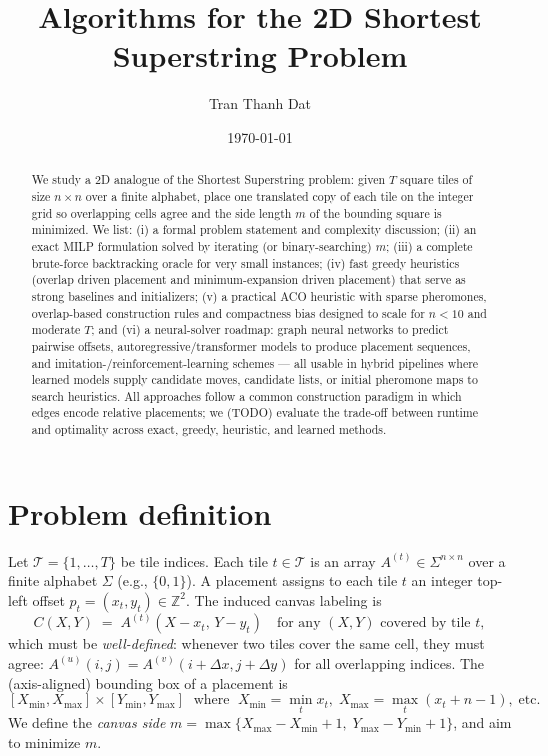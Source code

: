 \documentclass[11pt]{article}
\title{Algorithms for the \newline 2D Shortest Superstring Problem}
\author{Tran Thanh Dat}
\date{\today}
\newcommand{\bbZ}{\mathbb{Z}}
\begin{document}
\maketitle

\begin{abstract}
We study a 2D analogue of the Shortest Superstring problem: given $T$ square tiles of size $n\times n$ over a finite alphabet, place one translated copy of each tile on the integer grid so overlapping cells agree and the side length $m$ of the bounding square is minimized. We list: (i) a formal problem statement and complexity discussion; (ii) an exact MILP formulation solved by iterating (or binary-searching) $m$; (iii) a complete brute-force backtracking oracle for very small instances; (iv) fast greedy heuristics (overlap driven placement and minimum-expansion driven placement) that serve as strong baselines and initializers; (v) a practical ACO heuristic with sparse pheromones, overlap-based construction rules and compactness bias designed to scale for $n<10$ and moderate $T$; and (vi) a neural-solver roadmap: graph neural networks to predict pairwise offsets, autoregressive/transformer models to produce placement sequences, and imitation-/reinforcement-learning schemes — all usable in hybrid pipelines where learned models supply candidate moves, candidate lists, or initial pheromone maps to search heuristics. All approaches follow a common construction paradigm in which edges encode relative placements; we (TODO) evaluate the trade-off between runtime and optimality across exact, greedy, heuristic, and learned methods.

\end{abstract}

\section{Problem definition}
Let $\mathcal{T}=\{1,\dots,T\}$ be tile indices. Each tile $t\in\mathcal{T}$ is an array $A^{(t)}\in\Sigma^{n\times n}$ over a finite alphabet $\Sigma$ (e.g., $\{0,1\}$). A placement assigns to each tile $t$ an integer top-left offset $p_t=(x_t,y_t)\in\bbZ^2$. The induced canvas labeling is
\[
C(X,Y) \;=\; A^{(t)}(X-x_t,\,Y-y_t) \quad \text{for any $(X,Y)$ covered by tile $t$},
\]
which must be \emph{well-defined}: whenever two tiles cover the same cell, they must agree: $A^{(u)}(i,j)=A^{(v)}(i+\Delta x, j+\Delta y)$ for all overlapping indices. The (axis-aligned) bounding box of a placement is
\[
[X_{\min},X_{\max}]\times[Y_{\min},Y_{\max}] \;\text{ where }\; X_{\min}=\min_t x_t,\; X_{\max}=\max_t(x_t+n-1),\; \text{etc.}
\]
We define the \emph{canvas side} $m=\max\{X_{\max}-X_{\min}+1,\;Y_{\max}-Y_{\min}+1\}$, and aim to minimize $m$.
\end{document}
